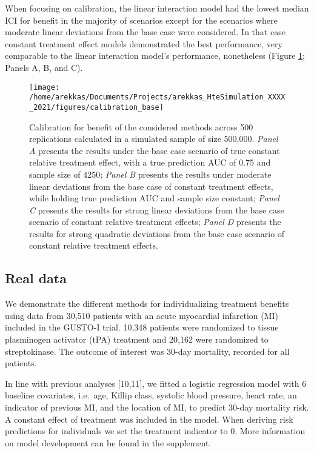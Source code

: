 \documentclass{article}
\begin{document}
When focusing on calibration, the linear interaction model had the
lowest median ICI for benefit in the majority of scenarios except for
the scenarios where moderate linear deviations from the base case were
considered. In that case constant treatment effect models demonstrated
the best performance, very comparable to the linear interaction model's
performance, nonetheless (Figure \ref{fig:calibration}; Panels A, B, and
C).

\begin{figure}
\texttt{[image: /home/arekkas/Documents/Projects/arekkas\_HteSimulation\_XXXX\_2021/figures/calibration\_base]} \caption{Calibration for benefit of the considered methods across 500 replications calculated in a simulated sample of size 500,000. \textit{Panel A} presents the results under the base case scenario of true constant relative treatment effect, with a true prediction AUC of 0.75 and sample size of 4250; \textit{Panel B} presents the results under moderate linear deviations from the base case of constant treatment effects, while holding true prediction AUC and sample size constant; \textit{Panel C} presents the results for strong linear deviations from the base case scenario of constant relative treatment effects; \textit{Panel D} presents the results for strong quadratic deviations from the base case scenario of constant relative treatment effects.}\label{fig:calibration}
\end{figure}

\hypertarget{real-data}{%
\subsection{Real data}\label{real-data}}

We demonstrate the different methods for individualizing treatment
benefits using data from 30,510 patients with an acute myocardial
infarction (MI) included in the GUSTO-I trial. 10,348 patients were
randomized to tissue plasminogen activator (tPA) treatment and 20,162
were randomized to streptokinase. The outcome of interest was 30-day
mortality, recorded for all patients.

In line with previous analyses {[}10,11{]}, we fitted a logistic
regression model with 6 baseline covariates, i.e.~age, Killip class,
systolic blood pressure, heart rate, an indicator of previous MI, and
the location of MI, to predict 30-day mortality risk. A constant effect
of treatment was included in the model. When deriving risk predictions
for individuals we set the treatment indicator to 0. More information on
model development can be found in the supplement.
\end{document}
